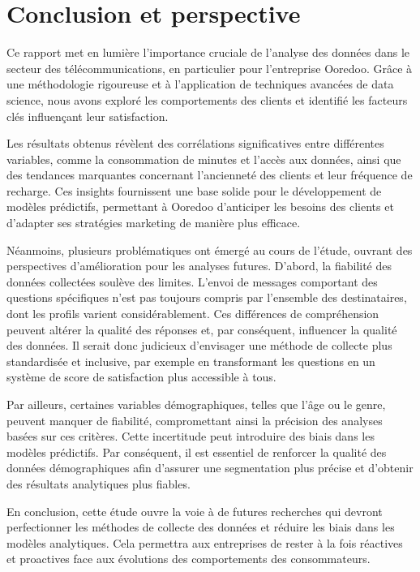 \chapter*{Conclusion et perspective}
\adjustmtc
\thispagestyle{MyStyle}


Ce rapport met en lumière l'importance cruciale de l'analyse des données dans le secteur des télécommunications, en particulier pour l'entreprise Ooredoo. Grâce à une méthodologie rigoureuse et à l'application de techniques avancées de data science, nous avons exploré les comportements des clients et identifié les facteurs clés influençant leur satisfaction.

Les résultats obtenus révèlent des corrélations significatives entre différentes variables, comme la consommation de minutes et l'accès aux données, ainsi que des tendances marquantes concernant l'ancienneté des clients et leur fréquence de recharge. Ces insights fournissent une base solide pour le développement de modèles prédictifs, permettant à Ooredoo d'anticiper les besoins des clients et d'adapter ses stratégies marketing de manière plus efficace.

Néanmoins, plusieurs problématiques ont émergé au cours de l'étude, ouvrant des perspectives d'amélioration pour les analyses futures. D'abord, la fiabilité des données collectées soulève des limites. L'envoi de messages comportant des questions spécifiques n'est pas toujours compris par l'ensemble des destinataires, dont les profils varient considérablement. Ces différences de compréhension peuvent altérer la qualité des réponses et, par conséquent, influencer la qualité des données. Il serait donc judicieux d'envisager une méthode de collecte plus standardisée et inclusive, par exemple en transformant les questions en un système de score de satisfaction plus accessible à tous.

Par ailleurs, certaines variables démographiques, telles que l'âge ou le genre, peuvent manquer de fiabilité, compromettant ainsi la précision des analyses basées sur ces critères. Cette incertitude peut introduire des biais dans les modèles prédictifs. Par conséquent, il est essentiel de renforcer la qualité des données démographiques afin d'assurer une segmentation plus précise et d'obtenir des résultats analytiques plus fiables.

En conclusion, cette étude ouvre la voie à de futures recherches qui devront perfectionner les méthodes de collecte des données et réduire les biais dans les modèles analytiques. Cela permettra aux entreprises de rester à la fois réactives et proactives face aux évolutions des comportements des consommateurs.
